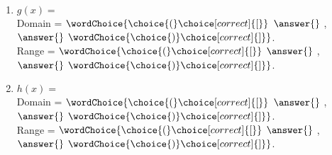 \documentclass{ximera}
\begin{document}
\begin{exercise}
\begin{enumerate}
\item $g(x) =  $ \\
Domain = $\wordChoice{\choice{(}\choice[correct]{[}}$ $\answer{}$ , $\answer{}$ $\wordChoice{\choice{)}\choice[correct]{]}}$.\\
Range = $\wordChoice{\choice{(}\choice[correct]{[}}$ $\answer{}$ , $\answer{}$ $\wordChoice{\choice{)}\choice[correct]{]}}$.


\item $h(x) =  $ \\
Domain = $\wordChoice{\choice{(}\choice[correct]{[}}$ $\answer{}$ , $\answer{}$ $\wordChoice{\choice{)}\choice[correct]{]}}$.\\
Range = $\wordChoice{\choice{(}\choice[correct]{[}}$ $\answer{}$ , $\answer{}$ $\wordChoice{\choice{)}\choice[correct]{]}}$.
\end{enumerate}

\end{exercise}
\end{document}
